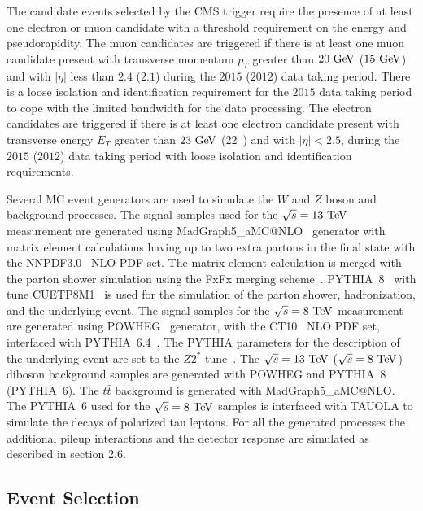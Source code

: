The candidate events selected by the CMS trigger require the presence of at least one electron or muon candidate with a threshold requirement on the energy and pseudorapidity. The muon candidates are triggered if there is at least one muon candidate present with transverse momentum $p_{T}$ greater than $20~\mathrm{Ge\kern -0.1em V}$ ($15~\mathrm{Ge\kern -0.1em V}$) and with $|\eta|$ less than $2.4$ ($2.1$) during the $2015$ ($2012$) data taking period. There is a loose isolation and identification requirement for the $2015$ data taking period to cope with the limited bandwidth for the data processing. The electron candidates are triggered if there is at least one electron candidate present with transverse energy $E_{T}$ greater than $23~\mathrm{Ge\kern -0.1em V}$ (22~\GeV) and with $|\eta|<2.5$, during the $2015$ ($2012$) data taking period with loose isolation and identification requirements.

Several MC event generators are used to simulate the $W$ and $Z$ boson and background processes. The signal samples used for the $\sqrt{s}=13~\mathrm{Te\kern -0.1em V}$ measurement are generated using MadGraph5\_aMC@NLO~\cite{Alwall:2007st} generator with matrix element calculations having up to two extra partons in the final state with the NNPDF3.0~\cite{Ball:2014uwa} NLO PDF set. The matrix element calculation is merged with the parton shower simulation using the FxFx merging scheme~\cite{Frederix:2012ps}. PYTHIA~8~\cite{Sjostrand:2006za,Sjostrand:2014zea}  with tune CUETP8M1~\cite{Skands:2014pea} is used for the simulation of the parton shower, hadronization, and the underlying event.  The signal samples for the $\sqrt{s}=8~\mathrm{Te\kern -0.1em V}$ measurement are generated using POWHEG~\cite{POWHEG-V, POWHEG1, POWHEG2, POWHEG3} generator, with the CT10~\cite{Lai:2010vv} NLO PDF set, interfaced with PYTHIA~6.4~\cite{Sjostrand:2006za}. The PYTHIA parameters for the description of the underlying event are set to the $Z2^{*}$ tune~\cite{CMS-PAS-FSQ-12-020}. The  $\sqrt{s}=13~\mathrm{Te\kern -0.1em V}$ ($\sqrt{s}=8~\mathrm{Te\kern -0.1em V}$) diboson background samples are generated with POWHEG and PYTHIA~8 (PYTHIA~6). The $t\bar{t}$ background is generated with MadGraph5\_aMC@NLO. The PYTHIA~6 used for the  $\sqrt{s}=8~\mathrm{Te\kern -0.1em V}$ samples is interfaced with TAUOLA to simulate the decays of polarized tau leptons. For all the generated processes the additional pileup interactions and the detector response are simulated as described in section 2.6.

\subsection{Event Selection}

